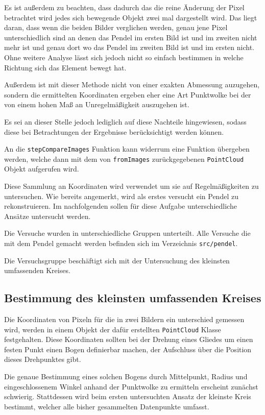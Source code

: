 Es ist außerdem zu beachten, dass dadurch das die reine Änderung der Pixel betrachtet wird jedes sich bewegende Objekt zwei mal dargestellt wird.
Das liegt daran, dass wenn die beiden Bilder verglichen werden, genau jene Pixel unterschiedlich sind an denen das Pendel im ersten Bild ist und im zweiten nicht mehr ist und genau dort wo das Pendel im zweiten Bild ist und im ersten nicht.
Ohne weitere Analyse lässt sich jedoch nicht so einfach bestimmen in welche Richtung sich das Element bewegt hat.

Außerdem ist mit dieser Methode nicht von einer exakten Abmessung auzugehen, sondern die ermittelten Koordinaten ergeben eher eine Art Punktwolke bei der von einem hohen Maß an Unregelmäßigkeit auszugehen ist.

Es sei an dieser Stelle jedoch lediglich auf diese Nachteile hingewiesen, sodass diese bei Betrachtungen der Ergebnisse berücksichtigt werden können.

An die \lstinline{stepCompareImages} Funktion kann widerrum eine Funktion übergeben werden, welche dann mit dem von \lstinline{fromImages} zurückgegebenen \lstinline{PointCloud} Objekt aufgerufen wird.

Diese Sammlung an Koordinaten wird verwendet um sie auf Regelmäßigkeiten zu untersuchen.
Wie bereits angemerkt, wird als erstes versucht ein Pendel zu rekonstruieren.
Im nachfolgenden sollen für diese Aufgabe unterschiedliche Ansätze untersucht werden.

Die Versuche wurden in unterschiedliche Gruppen unterteilt.
Alle Versuche die mit dem Pendel gemacht werden befinden sich im Verzeichnis \lstinline{src/pendel}.

Die Versuchsgruppe  beschäftigt sich mit der Untersuchung des kleinsten umfassenden Kreises. %

\subsection{Bestimmung des kleinsten umfassenden Kreises}

Die Koordinaten von Pixeln für die in zwei Bildern ein unterschied gemessen wird, werden in einem Objekt der dafür erstellten \lstinline{PointCloud} Klasse festgehalten.
Diese Koordinaten sollten bei der Drehung eines Gliedes um einen festen Punkt einen Bogen definierbar machen, der Aufschluss über die Position dieses Drehpunktes gibt.

Die genaue Bestimmung eines solchen Bogens durch Mittelpunkt, Radius und eingeschlossenem Winkel anhand der Punktwolke zu ermitteln erscheint zunächst schwierig.
Stattdessen wird beim ersten untersuchten Ansatz der kleinste Kreis bestimmt, welcher alle bisher gesammelten Datenpunkte umfasst.

